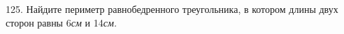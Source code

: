 125. Найдите периметр равнобедренного треугольника, в котором длины двух сторон равны 6{\it см} и 14{\it см.}\\
